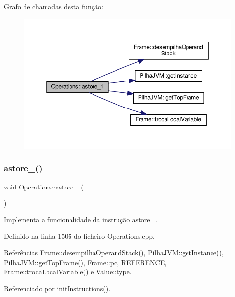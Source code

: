 Grafo de chamadas desta função\+:
\nopagebreak
\begin{figure}[H]
\begin{center}
\leavevmode
\includegraphics[width=350pt]{classOperations_a1a7a41be018313dd524df5327c8b6035_cgraph}
\end{center}
\end{figure}
\mbox{\label{classOperations_a01e238bbea0f9d61d80a8fcd3ed2f660}} 
\subsubsection{\texorpdfstring{astore\+\_()}{astore\_2()}}
{\footnotesize\ttfamily void Operations\+::astore\+\_ (\begin{DoxyParamCaption}{ }\end{DoxyParamCaption})\hspace{0.3cm}{\ttfamily [private]}}



Implementa a funcionalidade da instrução astore\+\_. 



Definido na linha 1506 do ficheiro Operations.\+cpp.



Referências Frame\+::desempilha\+Operand\+Stack(), Pilha\+J\+V\+M\+::get\+Instance(), Pilha\+J\+V\+M\+::get\+Top\+Frame(), Frame\+::pc, R\+E\+F\+E\+R\+E\+N\+CE, Frame\+::troca\+Local\+Variable() e Value\+::type.



Referenciado por init\+Instructions().

